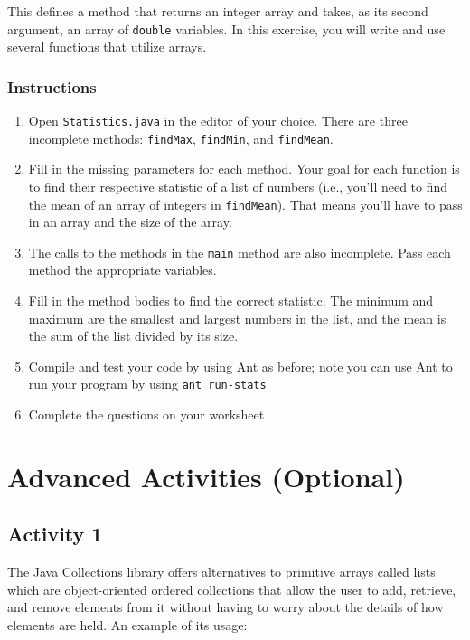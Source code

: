\documentclass[12pt]{scrartcl}
\begin{document}
This defines a method that returns an integer array and takes, 
as its second argument, an array of \texttt{double} 
variables.  In this exercise, you will write and use several 
functions that utilize arrays.

\subsubsection*{Instructions}
\begin{enumerate}
  \item Open \texttt{Statistics.java} in the editor of your choice.  There 
	are three incomplete methods: \texttt{findMax}, \texttt{findMin}, 
	and \texttt{findMean}.  
  \item Fill in the missing parameters for each method.  Your goal for each function is 
  	to find their respective statistic of a list of numbers (i.e., you'll need to find the 
	mean of an array of integers in \texttt{findMean}).  That means you'll 
	have to pass in an array and the size of the array.
  \item The calls to the methods in the \texttt{main} method are also incomplete.  
	Pass each method the appropriate variables.
  \item Fill in the method bodies to find the correct statistic.  The minimum and maximum 
	are the smallest and largest numbers in the list, and the mean is the sum of the 
	list divided by its size.  
  \item Compile and test your code by using Ant as before; note you can use Ant to 
	run your program by using \texttt{ant run-stats}
  \item Complete the questions on your worksheet 
\end{enumerate}
	
\section{Advanced Activities (Optional)}

\subsection{Activity 1}

The Java Collections library offers alternatives to primitive arrays called lists which 
are object-oriented ordered collections that allow the user to add, retrieve, and 
remove elements from it without having to worry about the details of how elements 
are held.  An example of its usage:
\end{document}
